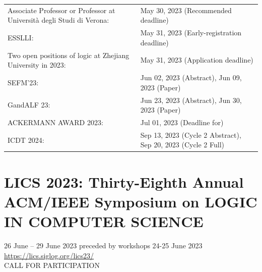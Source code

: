 \documentclass[prodmode,acmtecs]{acmsmall} %
\begin{document}
\begin{tabulary}{\linewidth}{LL}
Associate Professor or Professor at Università degli Studi di Verona:  & May 30, 2023 (Recommended deadline) \\
ESSLLI:  & May 31, 2023 (Early-registration deadline) \\
Two open positions of logic at Zhejiang University in 2023:  & May 31, 2023 (Application deadline) \\
SEFM'23:  & Jun 02, 2023 (Abstract), Jun 09, 2023 (Paper) \\
GandALF 23:  & Jun 23, 2023 (Abstract), Jun 30, 2023 (Paper) \\
ACKERMANN AWARD 2023:  & Jul 01, 2023 (Deadline for) \\
ICDT 2024:  & Sep 13, 2023 (Cycle 2 Abstract), Sep 20, 2023 (Cycle 2 Full) \\
\end{tabulary}
\section{LICS 2023: Thirty-Eighth Annual ACM/IEEE Symposium on LOGIC IN COMPUTER SCIENCE}\label{LICS2023}  26 June – 29 June 2023 preceded by workshops 24-25 June 2023\\ 
  \href{https://lics.siglog.org/lics23/}{https://lics.siglog.org/lics23/}\\ 
CALL FOR PARTICIPATION 
\end{document}

